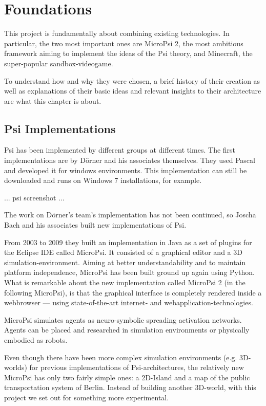 \chapter{Foundations}
This project is fundamentally about combining existing technologies. In particular, the two most important ones are MicroPsi 2, the most ambitious framework aiming to implement the ideas of the Psi theory, and Minecraft, the super-popular sandbox-videogame.

To understand how and why they were chosen, a brief history of their creation as well as explanations of their basic ideas and relevant insights to their architecture are what this chapter is about.

    \section{Psi Implementations}
Psi has been implemented by different groups at different times. The first implementations are by Dörner and his associates themselves. They used Pascal and developed it for windows environments. This implementation can still be downloaded and runs on Windows 7 installations, for example.

... psi screenshot ... %

The work on Dörner's team's implementation has not been continued, so Joscha Bach and his associates built new implementations of Psi.

From 2003 to 2009 they built an implementation in Java as a set of plugins for the Eclipse IDE called MicroPsi. It consisted of a graphical editor and a 3D simulation-environment. Aiming at better understandability and to maintain platform independence, MicroPsi has been built ground up again using Python. What is remarkable about the new implementation called MicroPsi 2 (in the following MicroPsi), is that the graphical interface is completely rendered inside a webbrowser --- using state-of-the-art internet- and webapplication-technologies.~\cite{conf/agi/Bach12}

MicroPsi simulates agents as neuro-symbolic spreading activation networks. Agents can be placed and researched in simulation environments or physically embodied as robots.~\cite{conf/agi/Bach12}
        
Even though there have been more complex simulation environments (e.g. 3D-worlds) for previous implementations of Psi-architectures, the relatively new MicroPsi has only two fairly simple ones: a 2D-Island and a map of the public transportation system of Berlin. Instead of building another 3D-world, with this project we set out for something more experimental.

